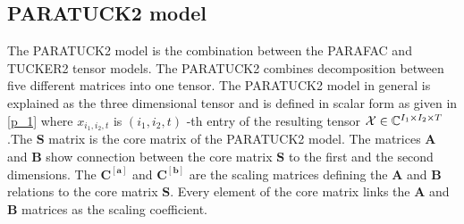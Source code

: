 \subsection{PARATUCK2 model}\label{part:PTM}
The PARATUCK2 model is the combination between the PARAFAC \cite{Book12} and TUCKER2 \cite{Book6} tensor models. The PARATUCK2 \cite{Book6} combines decomposition between five different matrices into one tensor. The
PARATUCK2 model in general is explained as the three dimensional
tensor and is defined in scalar form as given in \eqref{p_1} \cite{Book26}
where $x_{i_1,i_2,t}$ is $(i_1,i_2,t)$ -th entry of the resulting tensor $\mathcal{X} \in \mathbb{C}^{I_1 \times I_2 \times T }$.The $\mathbf{S}$ matrix is the core matrix of the PARATUCK2 model. The matrices $\mathbf{A}$ and $\mathbf{B}$ show connection
between the core matrix $\mathbf{S}$ to the first and the second dimensions. The $\mathbf{C^{[a]}}$ and $\mathbf{C^{[b]}}$ are the scaling matrices defining the $\mathbf{A}$ and $\mathbf{B}$ relations to the core matrix $\mathbf{S}$.  Every element of the core matrix links the $\mathbf{A}$ and $\mathbf{B}$ matrices as the scaling coefficient\cite{Book12}.

